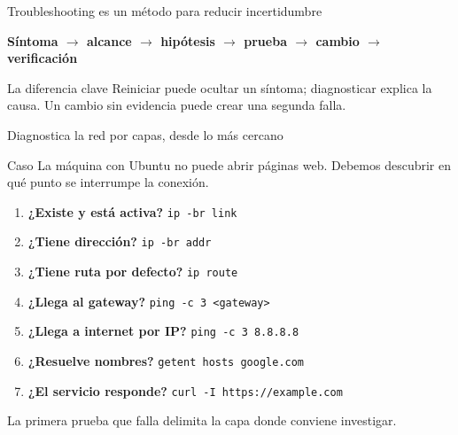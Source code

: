 \documentclass[aspectratio=169,10pt,c]{beamer}
\begin{document}
\begin{frame}{Troubleshooting es un método para reducir incertidumbre}
\begin{center}
\small\bfseries Síntoma $\rightarrow$ alcance $\rightarrow$ hipótesis $\rightarrow$ prueba $\rightarrow$ cambio $\rightarrow$ verificación
\end{center}
\begin{exampleblock}{La diferencia clave}
\small Reiniciar puede ocultar un síntoma; diagnosticar explica la causa. Un cambio sin evidencia puede crear una segunda falla.
\end{exampleblock}
\end{frame}

\begin{frame}{Diagnostica la red por capas, desde lo más cercano}
\begin{alertblock}{Caso}
\small La máquina con Ubuntu no puede abrir páginas web. Debemos descubrir en qué punto se interrumpe la conexión.
\end{alertblock}
\begin{enumerate}\setlength\itemsep{4pt}\small
  \item \textbf{¿Existe y está activa?} \texttt{ip -br link}
  \item \textbf{¿Tiene dirección?} \texttt{ip -br addr}
  \item \textbf{¿Tiene ruta por defecto?} \texttt{ip route}
  \item \textbf{¿Llega al gateway?} \texttt{ping -c 3 <gateway>}
  \item \textbf{¿Llega a internet por IP?} \texttt{ping -c 3 8.8.8.8}
  \item \textbf{¿Resuelve nombres?} \texttt{getent hosts google.com}
  \item \textbf{¿El servicio responde?} \texttt{curl -I https://example.com}
\end{enumerate}
\small La primera prueba que falla delimita la capa donde conviene investigar.
\end{frame}
\end{document}
